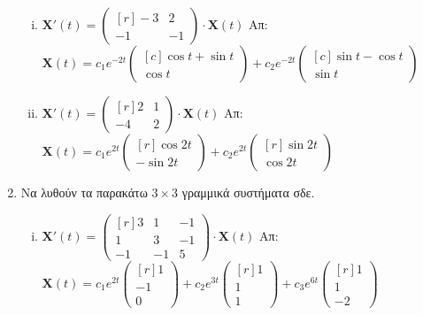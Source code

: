 \begin{enumerate}
\begin{enumerate}[i)]
			\item $ \mathbf{X}'(t) = 
				\begin{pmatrix*}[r]
					-3 & 2 \\
					-1 & -1
				\end{pmatrix*} \cdot 
				\mathbf{X}(t) $
				\hfill Απ: {\scriptsize $ \mathbf{X}(t) = c_{1}e^{-2t} 
				\begin{pmatrix*}[c] \cos{t} + \sin{t} \\ \cos{t} \end{pmatrix*} + c_{2}e^{-2t} 
				\begin{pmatrix*}[c] \sin{t} - \cos{t} \\ \sin{t} \end{pmatrix*} $}

			\item $ \mathbf{X}'(t) = 
				\begin{pmatrix*}[r]
					2 & 1 \\
					-4 & 2
				\end{pmatrix*} \cdot 
				\mathbf{X}(t) $
				\hfill Απ: {\scriptsize $ \mathbf{X}(t) = c_{1}e^{2t} 
					\begin{pmatrix*}[r] \cos{2t} \\ -\sin{2t} \end{pmatrix*} + c_{2}e^{2t} 
				\begin{pmatrix*}[r] \sin{2t} \\ \cos{2t}  \end{pmatrix*} $}

		\end{enumerate}

	\item Να λυθούν τα παρακάτω $ 3 \times 3$  γραμμικά συστήματα σδε.
		
		\begin{enumerate}[i)]

			\item $ \mathbf{X}'(t) = 
				\begin{pmatrix*}[r]
					3 & 1 & -1 \\
					1 & 3 & -1 \\
					-1 & -1 & 5
				\end{pmatrix*} \cdot 
				\mathbf{X}(t) $
				\hfill Απ: {\scriptsize $ \mathbf{X}(t) = c_{1}e^{2t} 
				\begin{pmatrix*}[r] 1 \\ -1 \\ 0 \end{pmatrix*} + c_{2}e^{3t} 
				\begin{pmatrix*}[r] 1 \\ 1 \\ 1 \end{pmatrix*} + c_{3} e^{6t}
			\begin{pmatrix*}[r] 1 \\ 1 \\ -2 \end{pmatrix*}$ }


\end{enumerate}
\end{enumerate}
